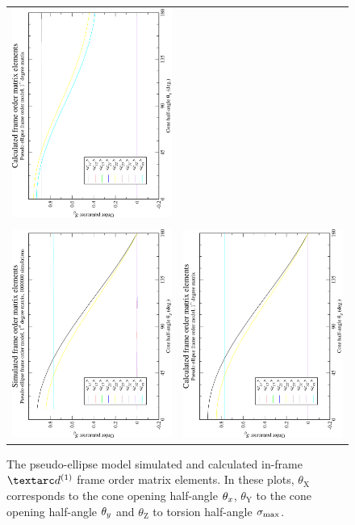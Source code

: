 \begin{figure}
\begin{tabular}{@{}cc@{}}
    \includegraphics[width=.35\textwidth,angle=270]{images/frame_order_matrix/Sij_pseudo-ellipse_in_frame_theta_y_calc.eps} \\
    \\[-5pt]
    \includegraphics[width=.35\textwidth,angle=270]{images/frame_order_matrix/Sij_pseudo-ellipse_in_frame_theta_z_ens1000000.eps} &
    \includegraphics[width=.35\textwidth,angle=270]{images/frame_order_matrix/Sij_pseudo-ellipse_in_frame_theta_z_calc.eps} \\
  \end{tabular}
  \caption[Pseudo-ellipse simulated and calculated in-frame $\FOone$ elements.]{
    The pseudo-ellipse model simulated and calculated in-frame $\FOone$ frame order matrix elements.
    In these plots, $\theta_\textrm{X}$ corresponds to the cone opening half-angle $\theta_x$, $\theta_\textrm{Y}$ to the cone opening half-angle $\theta_y$ and $\theta_\textrm{Z}$ to torsion half-angle $\sigma_\textrm{max}$.
}
\end{figure}
